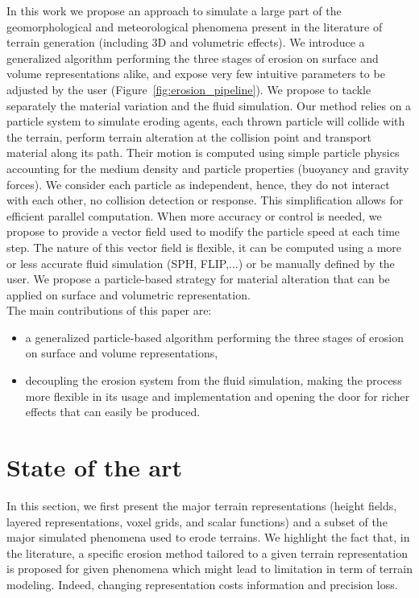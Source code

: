 In this work we propose an approach to simulate a large part of the geomorphological and meteorological phenomena present in the literature of terrain generation (including 3D and volumetric effects). We introduce a generalized algorithm performing the three stages of erosion on surface and volume representations alike, and expose very few intuitive parameters to be adjusted by the user (Figure~\ref{fig:erosion_pipeline}).
We propose to tackle separately the material variation and the fluid simulation. Our method relies on a particle system to simulate eroding agents, each thrown particle will collide with the terrain, perform terrain alteration at the collision point and transport material along its path. 
Their motion is computed using simple particle physics accounting for the medium density and particle properties (buoyancy and gravity forces). We consider each particle as independent, hence, they do not interact with each other, no collision detection or response. This simplification allows for efficient parallel computation. 
When more accuracy or control is needed, we propose to provide a vector field used to modify the particle speed at each time step. The nature of this vector field is flexible, it can be computed using a more or less accurate fluid simulation (SPH, FLIP,...) or be manually defined by the user. We propose a particle-based strategy for material alteration that can be applied on surface and volumetric representation. \\
The main contributions of this paper are: 
\begin{itemize}
\item a generalized particle-based algorithm performing the three
stages of erosion on surface and volume representations,
\item decoupling the erosion system from the fluid simulation, making the process more flexible in its usage and implementation and opening the door for richer effects that can easily be produced.
\end{itemize}
\section{State of the art}
\label{sec:erosion_state_of_the_art}
In this section, we first present the major terrain representations (height fields, layered representations, voxel grids, and scalar functions) and a subset of the major simulated phenomena used to erode terrains. We highlight the fact that, in the literature, a specific erosion method tailored to a given terrain representation is proposed for given phenomena which might lead to limitation in term of terrain modeling. Indeed, changing representation costs information and precision loss.
